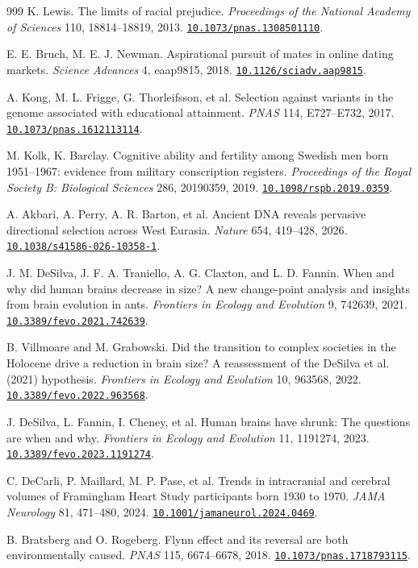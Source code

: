 \documentclass[10pt,twocolumn,letterpaper]{article}
\newcommand{\doi}[1]{\href{https://doi.org/#1}{\nolinkurl{#1}}}
\begin{document}
\begin{thebibliography}{999}
 K. Lewis. The limits of racial prejudice. \emph{Proceedings of the National Academy of Sciences} 110, 18814--18819, 2013. \doi{10.1073/pnas.1308501110}.

 E. E. Bruch, M. E. J. Newman. Aspirational pursuit of mates in online dating markets. \emph{Science Advances} 4, eaap9815, 2018. \doi{10.1126/sciadv.aap9815}.

 A. Kong, M. L. Frigge, G. Thorleifsson, et al. Selection against variants in the genome associated with educational attainment. \emph{PNAS} 114, E727--E732, 2017. \doi{10.1073/pnas.1612113114}.

 M. Kolk, K. Barclay. Cognitive ability and fertility among Swedish men born 1951--1967: evidence from military conscription registers. \emph{Proceedings of the Royal Society B: Biological Sciences} 286, 20190359, 2019. \doi{10.1098/rspb.2019.0359}.

 A. Akbari, A. Perry, A. R. Barton, et al. Ancient DNA reveals pervasive directional selection across West Eurasia. \emph{Nature} 654, 419--428, 2026. \doi{10.1038/s41586-026-10358-1}.

 J. M. DeSilva, J. F. A. Traniello, A. G. Claxton, and L. D. Fannin. When and why did human brains decrease in size? A new change-point analysis and insights from brain evolution in ants. \emph{Frontiers in Ecology and Evolution} 9, 742639, 2021. \doi{10.3389/fevo.2021.742639}.

 B. Villmoare and M. Grabowski. Did the transition to complex societies in the Holocene drive a reduction in brain size? A reassessment of the DeSilva et al. (2021) hypothesis. \emph{Frontiers in Ecology and Evolution} 10, 963568, 2022. \doi{10.3389/fevo.2022.963568}.

\newpage
{} J. DeSilva, L. Fannin, I. Cheney, et al. Human brains have shrunk: The questions are when and why. \emph{Frontiers in Ecology and Evolution} 11, 1191274, 2023. \doi{10.3389/fevo.2023.1191274}.

 C. DeCarli, P. Maillard, M. P. Pase, et al. Trends in intracranial and cerebral volumes of Framingham Heart Study participants born 1930 to 1970. \emph{JAMA Neurology} 81, 471--480, 2024. \doi{10.1001/jamaneurol.2024.0469}.

 B. Bratsberg and O. Rogeberg. Flynn effect and its reversal are both environmentally caused. \emph{PNAS} 115, 6674--6678, 2018. \doi{10.1073/pnas.1718793115}.


\end{thebibliography}
\end{document}
